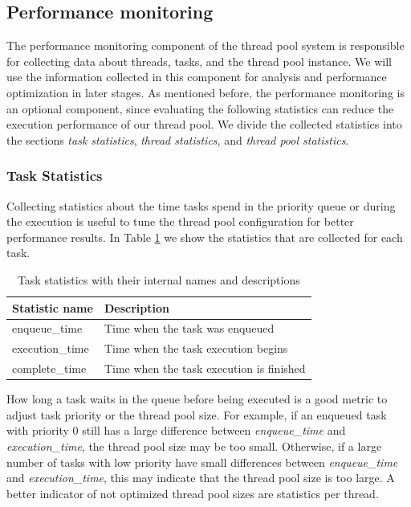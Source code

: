 \documentclass[conference]{IEEEtran}
\begin{document}
\subsection{Performance monitoring}\label{subsec:monitor}
The performance monitoring component of the thread pool system is responsible for collecting data about threads, tasks, and the thread pool instance. We will use the information collected in this component for analysis and performance optimization in later stages. As mentioned before, the performance monitoring is an optional component, since evaluating the following statistics can reduce the execution performance of our thread pool. We divide the collected statistics into the sections \emph{task statistics}, \emph{thread statistics}, and \emph{thread pool statistics}.

\subsubsection{Task Statistics}
Collecting statistics about the time tasks spend in the priority queue or during the execution is useful to tune the thread pool configuration for better performance results. In Table \ref{tab2} we show the statistics that are collected for each task.

\begin{table}[htbp]
	\caption{Task statistics with their internal names and descriptions}
	\begin{center}
		\begin{tabular}{ l l }
			\hline
			\textbf{Statistic name}&\textbf{Description}\\
			\hline
			enqueue\_time & Time when the task was enqueued \\
			execution\_time & Time when the task execution begins \\
			complete\_time & Time when the task execution is finished \\
			\hline
		\end{tabular}
		\label{tab2}
	\end{center}
\end{table}

How long a task waits in the queue before being executed is a good metric to adjust task priority or the thread pool size. For example, if an enqueued task with priority 0 still has a large difference between \emph{enqueue\_time} and \emph{execution\_time}, the thread pool size may be too small. Otherwise, if a large number of tasks with low priority have small differences between \emph{enqueue\_time} and \emph{execution\_time}, this may indicate that the thread pool size is too large. A better indicator of not optimized thread pool sizes are statistics per thread.
\end{document}
